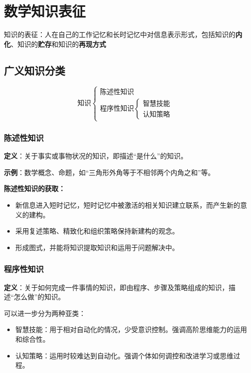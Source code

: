 \chapter{数学知识表征}

知识的表征：人在自己的工作记忆和长时记忆中对信息表示形式，包括知识的\textbf{内化}、知识的\textbf{贮存}和知识的\textbf{再现方式}

\section{广义知识分类}

\[
\text{知识}
\begin{cases}
    \text{陈述性知识} \\
    \text{程序性知识}
    \begin{cases}
        \text{智慧技能} \\ 
        \text{认知策略}
    \end{cases}
\end{cases}
\]

\subsection{陈述性知识}

\textbf{定义}：关于事实或事物状况的知识，即描述“是什么”的知识。

\textbf{示例}：数学概念、命题，如“三角形外角等于不相邻两个内角之和”等。

\textbf{陈述性知识的获取：}
\begin{itemize}
    \item 新信息进入短时记忆，短时记忆中被激活的相关知识建立联系，而产生新的意义的建构。
    \item 采用复述策略、精致化和组织策略保持新建构的观念。
    \item 形成图式，并能将知识提取知识和运用于问题解决中。
\end{itemize}




\subsection{程序性知识}

\textbf{定义}：关于如何完成一件事情的知识，即由程序、步骤及策略组成的知识，描述“怎么做”的知识。

可以进一步分为两种亚类：
\begin{itemize}
    \item 智慧技能：用于相对自动化的情况，少受意识控制。强调高阶思维能力的运用和综合性。
    \item 认知策略：运用时较难达到自动化。强调个体如何调控和改进学习或思维过程。
\end{itemize}

